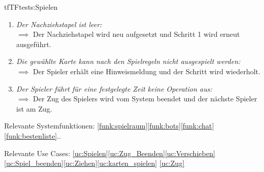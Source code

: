 \begin{description}[leftmargin=5em, style=sameline]
\begin{lhp}{tf}{TF}{tests:Spielen}
\begin{enumerate}
				\item \textit{Der Nachziehstapel ist leer:}\\ $\implies$ Der Nachziehstapel wird neu aufgesetzt und Schritt 1 wird erneut ausgeführt.
				
				\item \textit{Die gewählte Karte kann nach den Spielregeln nicht ausgespielt werden:}\\ $\implies$ Der Spieler erhält eine Hinweismeldung und der Schritt wird wiederholt.
				
				\item \textit{Der Spieler führt für eine festgelegte Zeit keine Operation aus:}\\ $\implies$ Der Zug des
				Spielers wird vom System beendet und der nächste Spieler ist am Zug.
		\end{enumerate}
	\item [Relevante Systemfunktionen:] \ref{funk:spielraum}\ref{funk:bots}\ref{funk:chat}\ref{funk:bestenliste}..
	\item [Relevante Use Cases:] \ref{uc:Spielen}\ref{uc:Zug_Beenden}\ref{uc:Verschieben}\ref{uc:Spiel_beenden}\ref{uc:Ziehen}\ref{uc:karten_spielen} \ref{uc:Zug}
\end{lhp}
\end{description}
